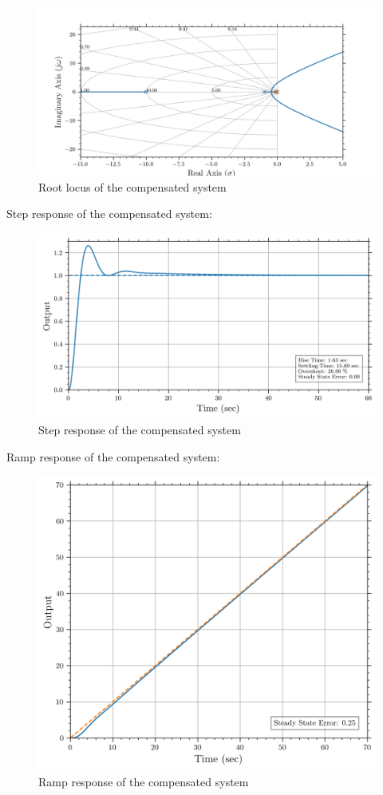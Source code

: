 \documentclass[12pt]{article}
\begin{document}
\begin{figure}[h!]
    \centering
    \includegraphics[width=0.8\linewidth]{rootlocus_compensated.png}
    \caption {Root locus of the compensated system}
    \label{fig:root_locus_compensated}
\end{figure}

\clearpage

Step response of the compensated system:
\begin{figure}[h!]
    \centering
    \includegraphics[width=0.8\linewidth]{step_response_compensated.png}
    \caption {Step response of the compensated system}
    \label{fig:step_compensated}
\end{figure}

Ramp response of the compensated system:
\begin{figure}[h!]
    \centering
    \includegraphics[width=0.7\linewidth]{ramp_response_compensated.png}
    \caption {Ramp response of the compensated system}
    \label{fig:ramp_compensated}
\end{figure}
\end{document}
